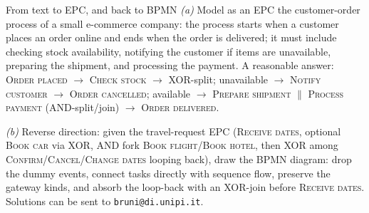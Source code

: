 \begin{examplebox}{From text to EPC, and back to BPMN}
\emph{(a)} Model as an EPC the customer-order process of a small e-commerce company: the process starts when a customer places an order online and ends when the order is delivered; it must include checking stock availability, notifying the customer if items are unavailable, preparing the shipment, and processing the payment. A reasonable answer: \textsc{Order placed} $\to$ \textsc{Check stock} $\to$ XOR-split; unavailable $\to$ \textsc{Notify customer} $\to$ \textsc{Order cancelled}; available $\to$ \textsc{Prepare shipment} $\|$ \textsc{Process payment} (AND-split/join) $\to$ \textsc{Order delivered}.
\par\smallskip
\emph{(b)} Reverse direction: given the travel-request EPC (\textsc{Receive dates}, optional \textsc{Book car} via XOR, AND fork \textsc{Book flight}/\textsc{Book hotel}, then XOR among \textsc{Confirm}/\textsc{Cancel}/\textsc{Change dates} looping back), draw the BPMN diagram: drop the dummy events, connect tasks directly with sequence flow, preserve the gateway kinds, and absorb the loop-back with an XOR-join before \textsc{Receive dates}. Solutions can be sent to \texttt{bruni@di.unipi.it}.
\end{examplebox}
